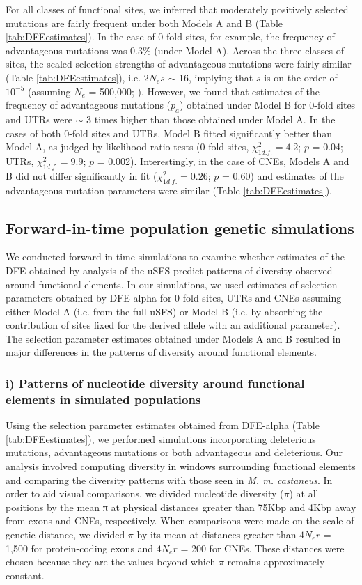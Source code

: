 	For all classes of functional sites, we inferred that moderately positively selected mutations are fairly frequent under both Models A and B (Table \ref{tab:DFEestimates}). In the case of 0-fold sites, for example, the frequency of advantageous mutations was 0.3\% (under Model A). Across the three classes of sites, the scaled selection strengths of advantageous mutations were fairly similar (Table \ref{tab:DFEestimates}), i.e. $2N_es$ $\sim$ 16, implying that $s$ is on the order of $10^{-5}$ (assuming $N_e$ = 500,000; \citealt{RN315}). However, we found that estimates of the frequency of advantageous mutations ($p_a$) obtained under Model B for 0-fold sites and UTRs were $\sim$ 3 times higher than those obtained under Model A. In the cases of both 0-fold sites and UTRs, Model B fitted significantly better than Model A, as judged by likelihood ratio tests (0-fold sites, $\chi^{2}_{1 d.f.} = 4.2$; $p$ = 0.04; UTRs, $\chi^{2}_{1 d.f.}= 9.9$; $p$ = 0.002). Interestingly, in the case of CNEs, Models A and B did not differ significantly in fit ($\chi^{2}_{1 d.f.} = 0.26$; $p$ = 0.60) and estimates of the advantageous mutation parameters were similar (Table \ref{tab:DFEestimates}). 

\subsection{Forward-in-time population genetic simulations}

        	We conducted forward-in-time simulations to examine whether estimates of the DFE obtained by analysis of the uSFS predict patterns of diversity observed around functional elements. In our simulations, we used estimates of selection parameters obtained by DFE-alpha for 0-fold sites, UTRs and CNEs assuming either Model A (i.e. from the full uSFS) or Model B (i.e. by absorbing the contribution of sites fixed for the derived allele with an additional parameter). The selection parameter estimates obtained under Models A and B resulted in major differences in the patterns of diversity around functional elements.

\subsubsection{i) Patterns of nucleotide diversity around functional elements in simulated populations}

	Using the selection parameter estimates obtained from DFE-alpha (Table \ref{tab:DFEestimates}), we performed simulations incorporating deleterious mutations, advantageous mutations or both advantageous and deleterious. Our analysis involved computing diversity in windows surrounding functional elements and comparing the diversity patterns with those seen in \textit{M. m. castaneus}. In order to aid visual comparisons, we divided nucleotide diversity ($\pi$) at all positions by the mean π at physical distances greater than 75Kbp and 4Kbp away from exons and CNEs, respectively. When comparisons were made on the scale of genetic distance, we divided $\pi$ by its mean at distances greater than $4N_er$ = 1,500 for protein-coding exons and $4N_er$ = 200 for CNEs. These distances were chosen because they are the values beyond which $\pi$ remains approximately constant. 

